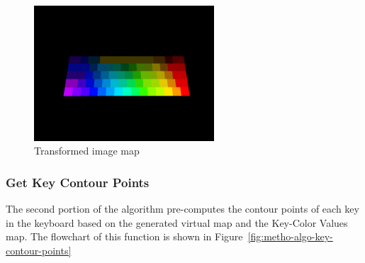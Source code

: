 \documentclass{report}
\begin{document}
\begin{figure}[H]
	\centering
	\includegraphics[width=0.6\textwidth]{transformed-image-map.png}
	\caption{Transformed image map}
	\centering
\end{figure}

\subsubsection{Get Key Contour Points}
The second portion of the algorithm pre-computes the contour points of each key
in the keyboard based on the generated virtual map and the Key-Color Values map.
The flowchart of this function is shown in
Figure~\ref{fig:metho-algo-key-contour-points}
\end{document}

